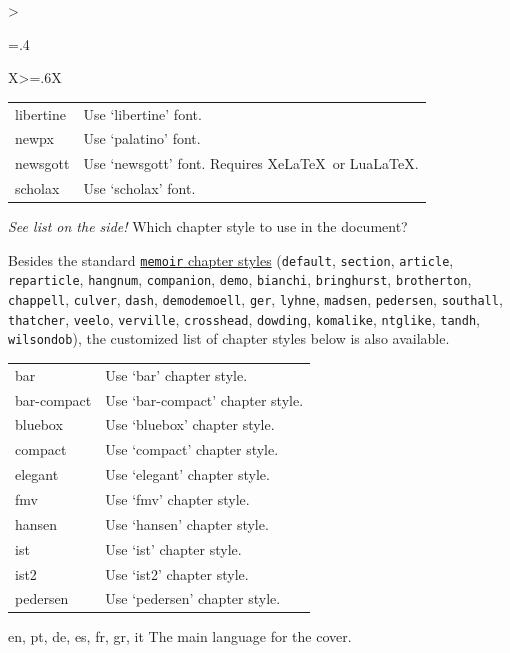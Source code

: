 \begin{xltabular}{\linewidth}{>{\hsize=.4\hsize\raggedright\arraybackslash}X>{\hsize=.6\hsize}X}
{\begin{tabular}{@{}l@{ $\rightarrow$ }X@{}}
		libertine 	& Use `libertine' font.\\
		newpx 		& Use `palatino' font. \\
		newsgott 	& Use `newsgott' font. Requires Xe\LaTeX\ or Lua\LaTeX.\\
		scholax 	& Use `scholax' font.\\
    \end{tabular}
    }
	    \midrule
	    {\emph{See list on the side!}}%
	    {Which chapter style to use in the document?}%
	{%
	Besides the standard \href{https://tug.ctan.org/info/MemoirChapStyles/MemoirChapStyles.pdf}{\texttt{memoir} chapter styles} (\texttt{default}, \texttt{section}, \texttt{article}, \texttt{reparticle}, \texttt{hangnum}, \texttt{companion}, \texttt{demo}, \texttt{bianchi}, \texttt{bringhurst}, \texttt{brotherton}, \texttt{chappell}, \texttt{culver}, \texttt{dash}, \texttt{demodemoell}, \texttt{ger}, \texttt{lyhne}, \texttt{madsen}, \texttt{pedersen}, \texttt{southall}, \texttt{thatcher}, \texttt{veelo}, \texttt{verville}, \texttt{crosshead}, \texttt{dowding}, \texttt{komalike}, \texttt{ntglike}, \texttt{tandh}, \texttt{wilsondob}), the customized list of chapter styles below is also available.
	    \begin{tabular}{@{}l@{ $\rightarrow$ }X@{}}
		bar 		& Use `bar' chapter style. \\
		bar-compact	& Use `bar-compact' chapter style.\\
		bluebox 	& Use `bluebox' chapter style.\\
		compact 	& Use `compact' chapter style.\\
		elegant 	& Use `elegant' chapter style.\\
		fmv 		& Use `fmv' chapter style.\\
		hansen 		& Use `hansen' chapter style.\\
		ist 		& Use `ist' chapter style.\\
		ist2 		& Use `ist2' chapter style.\\
		pedersen 	& Use `pedersen' chapter style.\\
	    \end{tabular}
	    }
    \midrule
    {en, pt, de, es, fr, gr, it}%
    {The main language for the cover.}%
	{%
    }

\end{xltabular}
